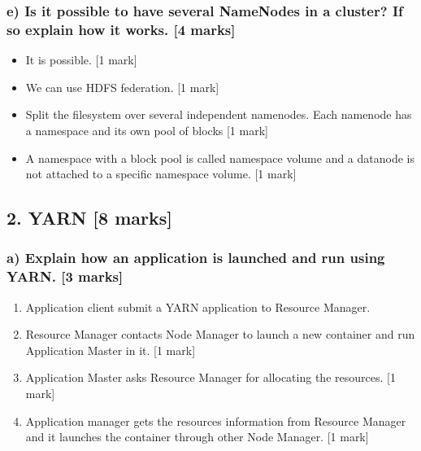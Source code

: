 \documentclass[11pt,a4paper]{article}
\begin{document}
\subsubsection*{e) Is it possible to have several NameNodes in a cluster? If so explain how it works. [4 marks]}

\begin{itemize}
\item It is possible. [1 mark]
\item We can use HDFS federation. [1 mark] 
\item Split the filesystem over several independent namenodes. Each namenode has a namespace and its own pool of blocks [1 mark]
\item A namespace with a block pool is called namespace volume and a datanode is not attached to a specific namespace volume. [1 mark]
\end{itemize}

\subsection*{2. YARN [8 marks]}
\subsubsection*{a) Explain how an application is launched and run using YARN. [3 marks]}
\begin{enumerate}
	\item Application client submit a YARN application to Resource Manager.
	\item Resource Manager contacts Node Manager to launch a new container and run Application Master in it. [1 mark]
	\item Application Master asks Resource Manager for allocating the resources. [1 mark]
	\item Application manager gets the resources information from Resource Manager and it launches the container through other Node Manager. [1 mark]
\end{enumerate}
\end{document}
